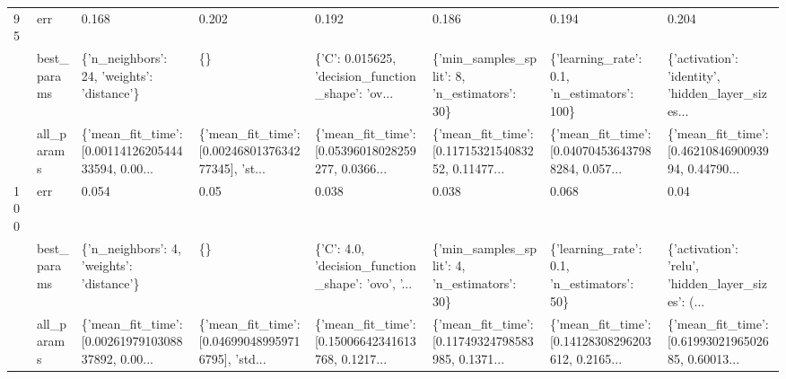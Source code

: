 \begin{tabular}{llllllll}
95  & err &                                              0.168 &                                              0.202 &                                              0.192 &                                              0.186 &                                              0.194 &                                              0.204 \\
    & best\_params &         \{'n\_neighbors': 24, 'weights': 'distance'\} &                                                 \{\} &  \{'C': 0.015625, 'decision\_function\_shape': 'ov... &       \{'min\_samples\_split': 8, 'n\_estimators': 30\} &        \{'learning\_rate': 0.1, 'n\_estimators': 100\} &  \{'activation': 'identity', 'hidden\_layer\_sizes... \\
    & all\_params &  \{'mean\_fit\_time': [0.0011412620544433594, 0.00... &  \{'mean\_fit\_time': [0.0024680137634277345], 'st... &  \{'mean\_fit\_time': [0.05396018028259277, 0.0366... &  \{'mean\_fit\_time': [0.1171532154083252, 0.11477... &  \{'mean\_fit\_time': [0.040704536437988284, 0.057... &  \{'mean\_fit\_time': [0.4621084690093994, 0.44790... \\
100 & err &                                              0.054 &                                               0.05 &                                              0.038 &                                              0.038 &                                              0.068 &                                               0.04 \\
    & best\_params &          \{'n\_neighbors': 4, 'weights': 'distance'\} &                                                 \{\} &  \{'C': 4.0, 'decision\_function\_shape': 'ovo', '... &       \{'min\_samples\_split': 4, 'n\_estimators': 30\} &         \{'learning\_rate': 0.1, 'n\_estimators': 50\} &  \{'activation': 'relu', 'hidden\_layer\_sizes': (... \\
    & all\_params &  \{'mean\_fit\_time': [0.0026197910308837892, 0.00... &  \{'mean\_fit\_time': [0.046990489959716795], 'std... &  \{'mean\_fit\_time': [0.15006642341613768, 0.1217... &  \{'mean\_fit\_time': [0.11749324798583985, 0.1371... &  \{'mean\_fit\_time': [0.14128308296203612, 0.2165... &  \{'mean\_fit\_time': [0.6199302196502685, 0.60013... \\
\bottomrule
\end{tabular}
